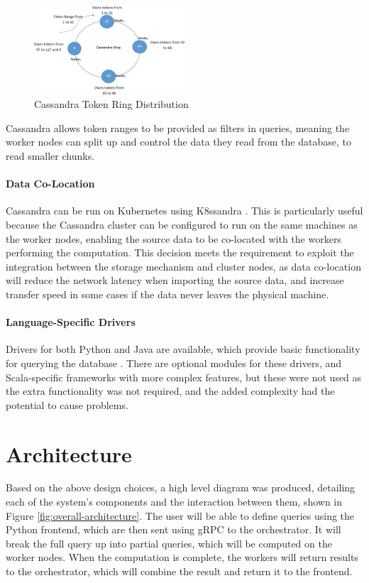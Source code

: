 \begin{figure}[h]
	\centering
	\includegraphics[width=0.5\textwidth]{chapters/diagrams/design/cassandra-token-distribution}
	\caption{Cassandra Token Ring Distribution \protect\cite{khatibi2019dynamic}}
	\label{fig:cassandra-token-distribution}
\end{figure}

Cassandra allows token ranges to be provided as filters in queries,  meaning the worker nodes can split up and control the data they read from the database, to read smaller chunks. 

\paragraph{Data Co-Location} Cassandra can be run on Kubernetes using K8ssandra \cite{k8ssandra}. This is particularly useful because the Cassandra cluster can be configured to run on the same machines as the worker nodes, enabling the source data to be co-located with the workers performing the computation. This decision meets the requirement to exploit the integration between the storage mechanism and cluster nodes, as data co-location will reduce the network latency when importing the source data, and increase transfer speed in some cases if the data never leaves the physical machine.

\paragraph{Language-Specific Drivers} Drivers for both Python and Java are available, which provide basic functionality for querying the database \cite{datastaxjavadriver, datastaxpythondriver}. There are optional modules for these drivers, and Scala-specific frameworks with more complex features, but these were not used as the extra functionality was not required, and the added complexity had the potential to cause problems. 

\section{Architecture}\label{sec:architecture}
Based on the above design choices, a high level diagram was produced, detailing each of the system's components and the interaction between them, shown in Figure \ref{fig:overall-architecture}. The user will be able to define queries using the Python frontend, which are then sent using gRPC to the orchestrator. It will break the full query up into partial queries, which will be computed on the worker nodes. When the computation is complete, the workers will return results to the orchestrator, which will combine the result and return it to the frontend.

